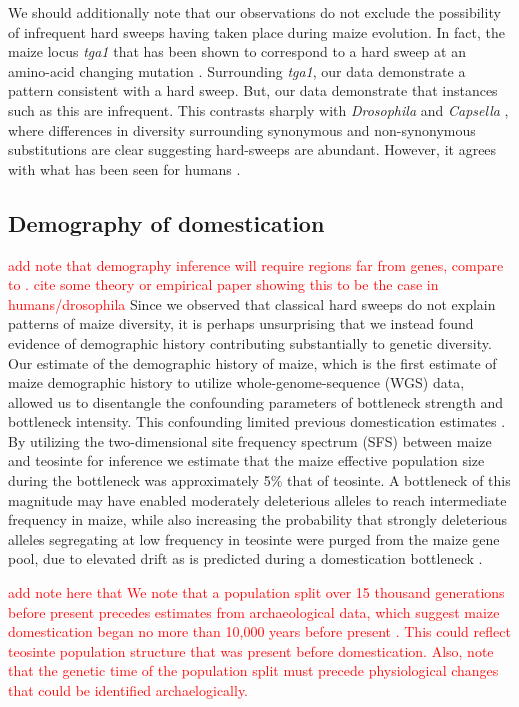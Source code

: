 \documentclass{pnastwo}
\newcommand{\jri}[1]{\textcolor{red}{\scriptsize #1}}
\begin{document}
\begin{article}
We should additionally note that our observations do not exclude the possibility of infrequent hard sweeps having taken place during maize evolution. In fact, the maize locus \emph{tga1} that has been shown to correspond to a hard sweep at an amino-acid changing mutation \cite{wang2015}. Surrounding \emph{tga1},  our data demonstrate a pattern consistent with a hard sweep. But, our data demonstrate that instances such as this are infrequent. This contrasts sharply with \emph{Drosophila} \cite{sattath2011} and \emph{Capsella} \cite{williamson2014}, where differences in diversity surrounding synonymous and non-synonymous substitutions are clear suggesting hard-sweeps are abundant. However, it agrees with what has been seen for humans \cite{hernandez2011}. 

\subsection{Demography of domestication}
\jri{add note that demography inference will require regions far from genes, compare to \cite{wright2005,wang1999,eyre1998}. cite some theory or empirical paper showing this to be the case in humans/drosophila}
Since we observed that classical hard sweeps do not explain patterns of maize diversity, it is perhaps unsurprising that we instead found evidence of demographic history contributing substantially to genetic diversity. Our estimate of the demographic history of maize, which is the first estimate of maize demographic history to utilize whole-genome-sequence (WGS) data, allowed us to disentangle the confounding parameters of bottleneck strength and bottleneck intensity. This confounding limited previous domestication estimates \cite{wright2005}. By utilizing the two-dimensional site frequency spectrum (SFS) between maize and teosinte for inference \cite{gutenkunst2009} we estimate that the maize effective population size during the bottleneck was approximately 5\% that of teosinte. A bottleneck of this magnitude may have enabled moderately deleterious alleles to reach intermediate frequency in maize, while also increasing the probability that strongly deleterious alleles segregating at low frequency in teosinte were purged from the maize gene pool, due to elevated drift as is predicted during a domestication bottleneck \cite{tajima1989}.

\jri{add note here that We note that a population split over 15 thousand generations before present precedes estimates from archaeological data, which suggest maize domestication began no more than 10,000 years before present \cite{smith1995}. 
This could reflect teosinte population  structure that was present before domestication. 
Also, note that the genetic time of the population split must precede physiological changes that could be identified archaelogically. }


\end{article}
\end{document}
